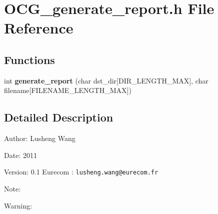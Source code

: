 \section{OCG\_\-generate\_\-report.h File Reference}
\label{OCG__generate__report_8h}
\subsection*{Functions}
\begin{CompactItemize}
\item 
int {\bf generate\_\-report} (char dst\_\-dir[DIR\_\-LENGTH\_\-MAX], char filename[FILENAME\_\-LENGTH\_\-MAX])
\end{CompactItemize}


\subsection{Detailed Description}
\begin{Desc}
\item[Author:]Lusheng Wang \end{Desc}
\begin{Desc}
\item[Date:]2011 \end{Desc}
\begin{Desc}
\item[Version:]0.1  Eurecom : {\tt lusheng.wang@eurecom.fr} \end{Desc}
\begin{Desc}
\item[Note:]\end{Desc}
\begin{Desc}
\item[Warning:]\end{Desc}
